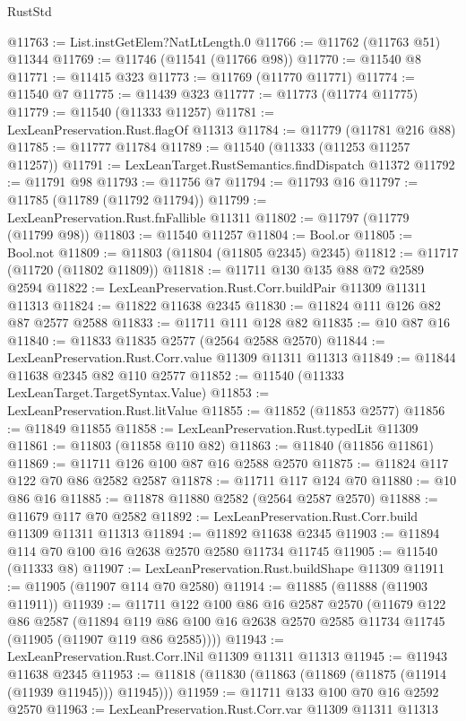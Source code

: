 \begin{lexlean}{RustStd}
\begin{coremodule}
@11763 := List.instGetElem?NatLtLength.{0}
@11766 := @11762 (@11763 @51) @11344
@11769 := @11746 (@11541 (@11766 @98))
@11770 := @11540 @8
@11771 := @11415 @323
@11773 := @11769 (@11770 @11771)
@11774 := @11540 @7
@11775 := @11439 @323
@11777 := @11773 (@11774 @11775)
@11779 := @11540 (@11333 @11257)
@11781 := LexLeanPreservation.Rust.flagOf @11313
@11784 := @11779 (@11781 @216 @88)
@11785 := @11777 @11784
@11789 := @11540 (@11333 (@11253 @11257 @11257))
@11791 := LexLeanTarget.RustSemantics.findDispatch @11372
@11792 := @11791 @98
@11793 := @11756 @7
@11794 := @11793 @16
@11797 := @11785 (@11789 (@11792 @11794))
@11799 := LexLeanPreservation.Rust.fnFallible @11311
@11802 := @11797 (@11779 (@11799 @98))
@11803 := @11540 @11257
@11804 := Bool.or
@11805 := Bool.not
@11809 := @11803 (@11804 (@11805 @2345) @2345)
@11812 := @11717 (@11720 (@11802 @11809))
@11818 := @11711 @130 @135 @88 @72 @2589 @2594
@11822 := LexLeanPreservation.Rust.Corr.buildPair @11309 @11311 @11313
@11824 := @11822 @11638 @2345
@11830 := @11824 @111 @126 @82 @87 @2577 @2588
@11833 := @11711 @111 @128 @82
@11835 := @10 @87 @16
@11840 := @11833 @11835 @2577 (@2564 @2588 @2570)
@11844 := LexLeanPreservation.Rust.Corr.value @11309 @11311 @11313
@11849 := @11844 @11638 @2345 @82 @110 @2577
@11852 := @11540 (@11333 LexLeanTarget.TargetSyntax.Value)
@11853 := LexLeanPreservation.Rust.litValue
@11855 := @11852 (@11853 @2577)
@11856 := @11849 @11855
@11858 := LexLeanPreservation.Rust.typedLit @11309
@11861 := @11803 (@11858 @110 @82)
@11863 := @11840 (@11856 @11861)
@11869 := @11711 @126 @100 @87 @16 @2588 @2570
@11875 := @11824 @117 @122 @70 @86 @2582 @2587
@11878 := @11711 @117 @124 @70
@11880 := @10 @86 @16
@11885 := @11878 @11880 @2582 (@2564 @2587 @2570)
@11888 := @11679 @117 @70 @2582
@11892 := LexLeanPreservation.Rust.Corr.build @11309 @11311 @11313
@11894 := @11892 @11638 @2345
@11903 := @11894 @114 @70 @100 @16 @2638 @2570 @2580 @11734 @11745
@11905 := @11540 (@11333 @8)
@11907 := LexLeanPreservation.Rust.buildShape @11309
@11911 := @11905 (@11907 @114 @70 @2580)
@11914 := @11885 (@11888 (@11903 @11911))
@11939 := @11711
    @122
    @100
    @86
    @16
    @2587
    @2570
    (@11679
      @122
      @86
      @2587
      (@11894 @119 @86 @100 @16 @2638 @2570 @2585 @11734 @11745 (@11905 (@11907 @119 @86 @2585))))
@11943 := LexLeanPreservation.Rust.Corr.lNil @11309 @11311 @11313
@11945 := @11943 @11638 @2345
@11953 := @11818 (@11830 (@11863 (@11869 (@11875 (@11914 (@11939 @11945))) @11945)))
@11959 := @11711 @133 @100 @70 @16 @2592 @2570
@11963 := LexLeanPreservation.Rust.Corr.var @11309 @11311 @11313

\end{coremodule}
\end{lexlean}
